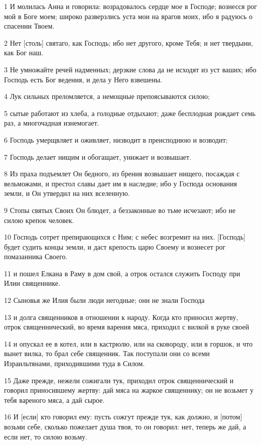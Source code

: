 \par 1 И молилась Анна и говорила: возрадовалось сердце мое в Господе; вознесся рог мой в Боге моем; широко разверзлись уста мои на врагов моих, ибо я радуюсь о спасении Твоем.
\par 2 Нет [столь] святаго, как Господь; ибо нет другого, кроме Тебя; и нет твердыни, как Бог наш.
\par 3 Не умножайте речей надменных; дерзкие слова да не исходят из уст ваших; ибо Господь есть Бог ведения, и дела у Него взвешены.
\par 4 Лук сильных преломляется, а немощные препоясываются силою;
\par 5 сытые работают из хлеба, а голодные отдыхают; даже бесплодная рождает семь раз, а многочадная изнемогает.
\par 6 Господь умерщвляет и оживляет, низводит в преисподнюю и возводит;
\par 7 Господь делает нищим и обогащает, унижает и возвышает.
\par 8 Из праха подъемлет Он бедного, из брения возвышает нищего, посаждая с вельможами, и престол славы дает им в наследие; ибо у Господа основания земли, и Он утвердил на них вселенную.
\par 9 Стопы святых Своих Он блюдет, а беззаконные во тьме исчезают; ибо не силою крепок человек.
\par 10 Господь сотрет препирающихся с Ним; с небес возгремит на них. [Господь] будет судить концы земли, и даст крепость царю Своему и вознесет рог помазанника Своего.
\par 11 и пошел Елкана в Раму в дом свой, а отрок остался служить Господу при Илии священнике.
\par 12 Сыновья же Илия были люди негодные; они не знали Господа
\par 13 и долга священников в отношении к народу. Когда кто приносил жертву, отрок священнический, во время варения мяса, приходил с вилкой в руке своей
\par 14 и опускал ее в котел, или в кастрюлю, или на сковороду, или в горшок, и что вынет вилка, то брал себе священник. Так поступали они со всеми Израильтянами, приходившими туда в Силом.
\par 15 Даже прежде, нежели сожигали тук, приходил отрок священнический и говорил приносившему жертву: дай мяса на жаркое священнику; он не возьмет у тебя вареного мяса, а дай сырое.
\par 16 И [если] кто говорил ему: пусть сожгут прежде тук, как должно, и [потом] возьми себе, сколько пожелает душа твоя, то он говорил: нет, теперь же дай, а если нет, то силою возьму.
